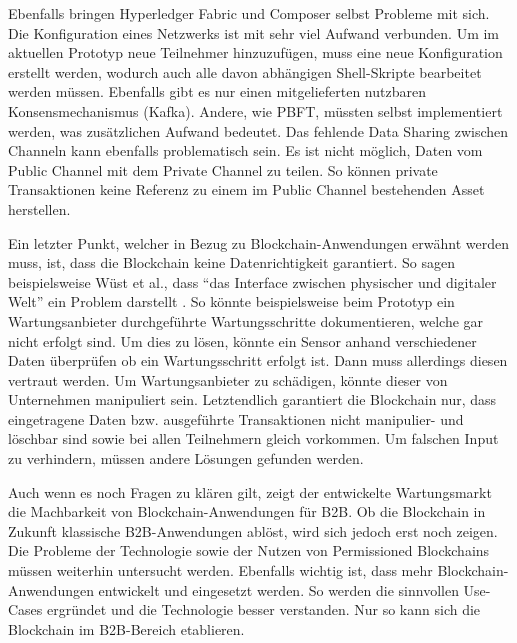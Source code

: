 Ebenfalls bringen Hyperledger Fabric und Composer selbst Probleme mit sich. Die Konfiguration eines Netzwerks ist mit sehr viel Aufwand verbunden. Um im aktuellen Prototyp neue Teilnehmer hinzuzufügen, muss eine neue Konfiguration erstellt werden, wodurch auch alle davon abhängigen Shell-Skripte bearbeitet werden müssen. Ebenfalls gibt es nur einen mitgelieferten nutzbaren Konsensmechanismus (Kafka). Andere, wie PBFT, müssten selbst implementiert werden, was zusätzlichen Aufwand bedeutet. Das fehlende Data Sharing zwischen Channeln kann ebenfalls problematisch sein. Es ist nicht möglich, Daten vom Public Channel mit dem Private Channel zu teilen. So können private Transaktionen keine Referenz zu einem im Public Channel bestehenden Asset herstellen.

Ein letzter Punkt, welcher in Bezug zu Blockchain-Anwendungen erwähnt werden muss, ist, dass die Blockchain keine Datenrichtigkeit garantiert. So sagen beispielsweise Wüst et al., dass ``das Interface zwischen physischer und digitaler Welt'' ein Problem darstellt \cite{WustyouneedBlockchain2017}. So könnte beispielsweise beim Prototyp ein Wartungsanbieter durchgeführte Wartungsschritte dokumentieren, welche gar nicht erfolgt sind. Um dies zu lösen, könnte ein Sensor anhand verschiedener Daten überprüfen ob ein Wartungsschritt erfolgt ist. Dann muss allerdings diesen vertraut werden. Um Wartungsanbieter zu schädigen, könnte dieser von Unternehmen manipuliert sein. Letztendlich garantiert die Blockchain nur, dass eingetragene Daten bzw. ausgeführte Transaktionen nicht manipulier- und löschbar sind sowie bei allen Teilnehmern gleich vorkommen. Um falschen Input zu verhindern, müssen andere Lösungen gefunden werden.

Auch wenn es noch Fragen zu klären gilt, zeigt der entwickelte Wartungsmarkt die Machbarkeit von Blockchain-Anwendungen für B2B. Ob die Blockchain in Zukunft klassische B2B-Anwendungen ablöst, wird sich jedoch erst noch zeigen. Die Probleme der Technologie sowie der Nutzen von Permissioned Blockchains müssen weiterhin untersucht werden. Ebenfalls wichtig ist, dass mehr Blockchain-Anwendungen entwickelt und eingesetzt werden. So werden die sinnvollen Use-Cases ergründet und die Technologie besser verstanden. Nur so kann sich die Blockchain im B2B-Bereich etablieren.


